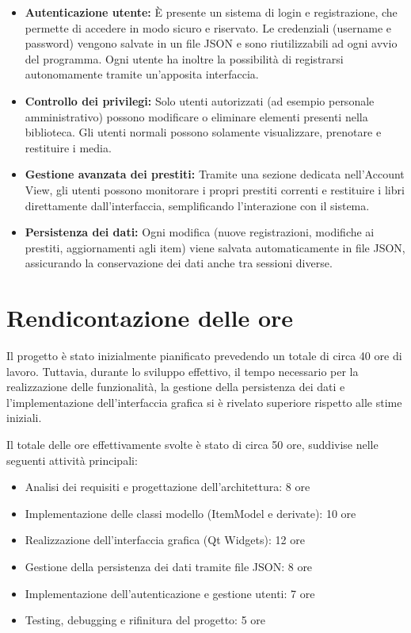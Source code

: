 \documentclass[a4paper,10pt]{article}
\begin{document}
\begin{itemize}
    \item \textbf{Autenticazione utente:} È presente un sistema di login e registrazione, che permette di accedere in modo sicuro e riservato. Le credenziali (username e password) vengono salvate in un file JSON e sono riutilizzabili ad ogni avvio del programma. Ogni utente ha inoltre la possibilità di registrarsi autonomamente tramite un'apposita interfaccia.

    \item \textbf{Controllo dei privilegi:} Solo utenti autorizzati (ad esempio personale amministrativo) possono modificare o eliminare elementi presenti nella biblioteca. Gli utenti normali possono solamente visualizzare, prenotare e restituire i media.

    \item \textbf{Gestione avanzata dei prestiti:} Tramite una sezione dedicata nell'Account View, gli utenti possono monitorare i propri prestiti correnti e restituire i libri direttamente dall'interfaccia, semplificando l'interazione con il sistema.

    \item \textbf{Persistenza dei dati:} Ogni modifica (nuove registrazioni, modifiche ai prestiti, aggiornamenti agli item) viene salvata automaticamente in file JSON, assicurando la conservazione dei dati anche tra sessioni diverse.
\end{itemize}

\section{Rendicontazione delle ore}

Il progetto è stato inizialmente pianificato prevedendo un totale di circa 40 ore di lavoro. Tuttavia, durante lo sviluppo effettivo, il tempo necessario per la realizzazione delle funzionalità, la gestione della persistenza dei dati e l'implementazione dell'interfaccia grafica si è rivelato superiore rispetto alle stime iniziali.

Il totale delle ore effettivamente svolte è stato di circa 50 ore, suddivise nelle seguenti attività principali:

\begin{itemize}
    \item Analisi dei requisiti e progettazione dell'architettura: 8 ore
    \item Implementazione delle classi modello (ItemModel e derivate): 10 ore
    \item Realizzazione dell'interfaccia grafica (Qt Widgets): 12 ore
    \item Gestione della persistenza dei dati tramite file JSON: 8 ore
    \item Implementazione dell'autenticazione e gestione utenti: 7 ore
    \item Testing, debugging e rifinitura del progetto: 5 ore
\end{itemize}
\end{document}
